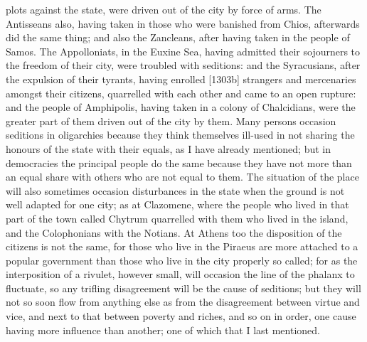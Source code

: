 plots against the state, were driven out of the city by force of arms. The
Antisseans also, having taken in those who were banished from Chios,
afterwards did the same thing; and also the Zancleans, after having taken
in the people of Samos. The Appolloniats, in the Euxine Sea, having
admitted their sojourners to the freedom of their city, were troubled with
seditions: and the Syracusians, after the expulsion of their tyrants,
having enrolled [1303b] strangers and mercenaries amongst their citizens,
quarrelled with each other and came to an open rupture: and the people of
Amphipolis, having taken in a colony of Chalcidians, were the greater part
of them driven out of the city by them. Many persons occasion seditions in
oligarchies because they think themselves ill-used in not sharing the
honours of the state with their equals, as I have already mentioned; but
in democracies the principal people do the same because they have not more
than an equal share with others who are not equal to them. The situation
of the place will also sometimes occasion disturbances in the state when
the ground is not well adapted for one city; as at Clazomene, where the
people who lived in that part of the town called Chytrum quarrelled with
them who lived in the island, and the Colophonians with the Notians. At
Athens too the disposition of the citizens is not the same, for those who
live in the Piraeus are more attached to a popular government than those
who live in the city properly so called; for as the interposition of a
rivulet, however small, will occasion the line of the phalanx to
fluctuate, so any trifling disagreement will be the cause of seditions;
but they will not so soon flow from anything else as from the disagreement
between virtue and vice, and next to that between poverty and riches, and
so on in order, one cause having more influence than another; one of which
that I last mentioned.


